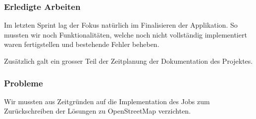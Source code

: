 \subsubsection{Erledigte Arbeiten}

Im letzten Sprint lag der Fokus natürlich im Finalisieren der Applikation.
So mussten wir noch Funktionalitäten, welche noch nicht vollständig implementiert waren fertigstellen und bestehende Fehler beheben.

Zusätzlich galt ein grosser Teil der Zeitplanung der Dokumentation des Projektes.

\subsubsection{Probleme}
Wir mussten aus Zeitgründen auf die Implementation des Jobs zum Zurückschreiben der Lösungen zu \gls{OpenStreetMap} verzichten.

